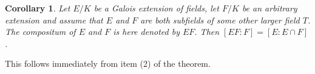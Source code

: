\documentclass[12pt]{article}
\newtheorem{cor}[thm]{Corollary}
\begin{document}
\begin{cor} Let $E/K$ be a Galois extension of fields, let $F/K$ be an arbitrary extension and assume that $E$ and $F$ are both subfields of some other larger field $T$. The compositum of $E$ and $F$ is here denoted by $EF$. Then $[EF:F] = [E:E\cap F]$.
\end{cor}

This follows immediately from item (2) of the theorem.
\end{document}
